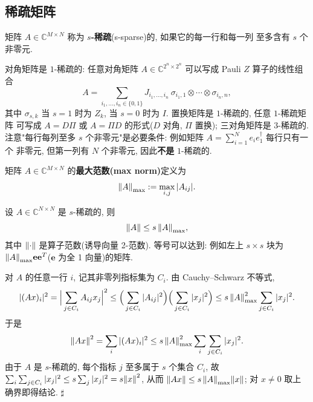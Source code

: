 \documentclass[utf8]{article} %
\numberwithin{equation}{section}   %
\newtheorem{Def}{\hskip 2em {\color{green} 定义}}[subsection]
\newtheorem{Lem}{\hskip 2em {\color{magenta} 引理}}[subsection]
\newtheorem{Eg}{\hskip 2em {\color{black} 例}}[subsection]
\newenvironment{Proof}{{\noindent\it Proof:}\quad}{\hfill $\sharp $\par}
\begin{document}
\subsection{稀疏矩阵}

\begin{Def}[s-稀疏矩阵]
    矩阵 $A \in \mathbb{C}^{M\times N}$ 称为 \textbf{$s$-稀疏}(s-sparse)的, 如果它的每一行和每一列
    至多含有 $s$ 个非零元.
\end{Def}

\begin{Eg}
    对角矩阵是 $1$-稀疏的: 任意对角矩阵 $A \in \mathbb{C}^{2^n\times 2^n}$ 可以写成 Pauli $Z$ 算子的线性组合
    \[ A = \sum_{i_1,\dots,i_n \in \{0,1\}} J_{i_1,\dots,i_n}\ \sigma_{i_1,1} \otimes \cdots \otimes \sigma_{i_n,n}, \]
    其中 $\sigma_{s,k}$ 当 $s=1$ 时为 $Z_k$, 当 $s=0$ 时为 $I$. 置换矩阵是 $1$-稀疏的, 任意 $1$-稀疏矩阵
    可写成 $A = D\Pi$ 或 $A = \Pi D$ 的形式($D$ 对角, $\Pi$ 置换); 三对角矩阵是 $3$-稀疏的.
    注意"每行每列至多 $s$ 个非零元"是必要条件: 例如矩阵 $A = \sum_{i=1}^N e_i e_1^\dagger$ 每行只有一个
    非零元, 但第一列有 $N$ 个非零元, 因此\textbf{不是} $1$-稀疏的.
\end{Eg}

\begin{Def}[最大范数]
    矩阵 $A \in \mathbb{C}^{M\times N}$ 的\textbf{最大范数(max norm)}定义为
    \[ \norm{A}_{\max} := \max_{i,j} |A_{ij}|. \]
\end{Def}

\begin{Lem}
    设 $A \in \mathbb{C}^{N\times N}$ 是 $s$-稀疏的, 则
    \begin{equation}
        \norm{A} \le s\, \norm{A}_{\max},
    \end{equation}
    其中 $\norm{\cdot}$ 是算子范数(诱导向量 2-范数). 等号可以达到: 例如左上 $s \times s$ 块为
    $\norm{A}_{\max} \mathbf{e}\mathbf{e}^T$($\mathbf{e}$ 为全 1 向量)的矩阵.
\end{Lem}

\begin{Proof}
    对 $A$ 的任意一行 $i$, 记其非零列指标集为 $C_i$. 由 Cauchy--Schwarz 不等式,
    \[
        |(Ax)_i|^2 = \Big|\sum_{j \in C_i} A_{ij} x_j\Big|^2
        \le \Big(\sum_{j \in C_i} |A_{ij}|^2\Big)\Big(\sum_{j \in C_i} |x_j|^2\Big)
        \le s\, \norm{A}_{\max}^2 \sum_{j \in C_i} |x_j|^2.
    \]
    于是
    \[
        \norm{Ax}^2 = \sum_i |(Ax)_i|^2 \le s\, \norm{A}_{\max}^2 \sum_i \sum_{j \in C_i} |x_j|^2.
    \]
    由于 $A$ 是 $s$-稀疏的, 每个指标 $j$ 至多属于 $s$ 个集合 $C_i$, 故
    $\sum_i \sum_{j \in C_i} |x_j|^2 \le s \sum_j |x_j|^2 = s\norm{x}^2$,
    从而 $\norm{Ax} \le s\, \norm{A}_{\max} \norm{x}$; 对 $x \neq 0$ 取上确界即得结论.
\end{Proof}
\end{document}
